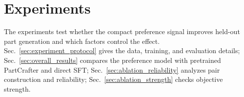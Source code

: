 \documentclass[10pt,twocolumn,letterpaper]{article}
\begin{document}
%
%
%
%

\section{Experiments}
The experiments test whether the compact preference signal improves held-out part generation and which factors control the effect. Sec.~\ref{sec:experiment_protocol} gives the data, training, and evaluation details; Sec.~\ref{sec:overall_results} compares the preference model with pretrained PartCrafter and direct SFT; Sec.~\ref{sec:ablation_reliability} analyzes pair construction and reliability; Sec.~\ref{sec:ablation_strength} checks objective strength.
\end{document}
